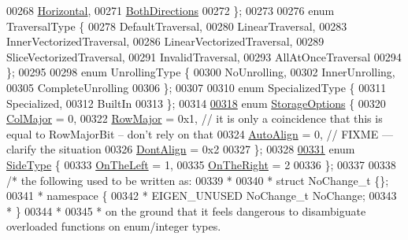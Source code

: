\begin{DoxyCode}
00268   \hyperlink{group__enums_ggad49a7b3738e273eb00932271b36127f7aae8a16b3b9272683c1162915f6d892be}{Horizontal}, 
00271   \hyperlink{group__enums_ggad49a7b3738e273eb00932271b36127f7aa01e40fce022901560ce6d9fdee2fde3}{BothDirections} 
00272 \};
00273 
00276 \textcolor{keyword}{enum} TraversalType \{
00278   DefaultTraversal,
00280   LinearTraversal,
00283   InnerVectorizedTraversal,
00286   LinearVectorizedTraversal,
00289   SliceVectorizedTraversal,
00291   InvalidTraversal,
00293   AllAtOnceTraversal
00294 \};
00295 
00298 \textcolor{keyword}{enum} UnrollingType \{
00300   NoUnrolling,
00302   InnerUnrolling,
00305   CompleteUnrolling
00306 \};
00307 
00310 \textcolor{keyword}{enum} SpecializedType \{
00311   Specialized,
00312   BuiltIn
00313 \};
00314 
\hyperlink{group__enums_gaacded1a18ae58b0f554751f6cdf9eb13}{00318} \textcolor{keyword}{enum} \hyperlink{group__enums_gaacded1a18ae58b0f554751f6cdf9eb13}{StorageOptions} \{
00320   \hyperlink{group__enums_ggaacded1a18ae58b0f554751f6cdf9eb13a0cbd4bdd0abcfc0224c5fcb5e4f6669a}{ColMajor} = 0,
00322   \hyperlink{group__enums_ggaacded1a18ae58b0f554751f6cdf9eb13acfcde9cd8677c5f7caf6bd603666aae3}{RowMajor} = 0x1,  \textcolor{comment}{// it is only a coincidence that this is equal to RowMajorBit -- don't rely on
       that}
00324 \textcolor{comment}{}  \hyperlink{group__enums_ggaacded1a18ae58b0f554751f6cdf9eb13a28d63c0dd8560827162decfd898804f4}{AutoAlign} = 0, \textcolor{comment}{// FIXME --- clarify the situation}
00326   \hyperlink{group__enums_ggaacded1a18ae58b0f554751f6cdf9eb13a40a452614141522dd313363dbbd65726}{DontAlign} = 0x2
00327 \};
00328 
\hyperlink{group__enums_gac22de43beeac7a78b384f99bed5cee0b}{00331} \textcolor{keyword}{enum} \hyperlink{group__enums_gac22de43beeac7a78b384f99bed5cee0b}{SideType} \{
00333   \hyperlink{group__enums_ggac22de43beeac7a78b384f99bed5cee0ba129609b3bdf23b071f5f86cf2f995ec4}{OnTheLeft} = 1,  
00335   \hyperlink{group__enums_ggac22de43beeac7a78b384f99bed5cee0ba99dc75d8e00b6c3a5bdc31940f47492b}{OnTheRight} = 2  
00336 \};
00337 
00338 \textcolor{comment}{/* the following used to be written as:}
00339 \textcolor{comment}{ *}
00340 \textcolor{comment}{ *   struct NoChange\_t \{\};}
00341 \textcolor{comment}{ *   namespace \{}
00342 \textcolor{comment}{ *     EIGEN\_UNUSED NoChange\_t NoChange;}
00343 \textcolor{comment}{ *   \}}
00344 \textcolor{comment}{ *}
00345 \textcolor{comment}{ * on the ground that it feels dangerous to disambiguate overloaded functions on enum/integer types.  }

\end{DoxyCode}
